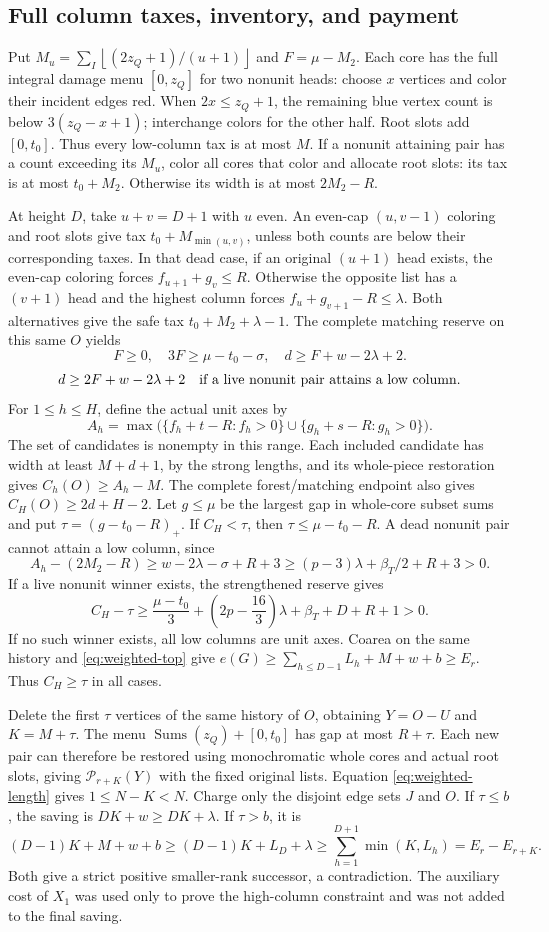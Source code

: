 \documentclass[11pt,a4paper]{article}
\newcommand{\p}{\mathcal P}
\newcommand{\floor}[1]{\left\lfloor#1\right\rfloor}
\theoremstyle{definition}
\begin{document}
\subsection{Full column taxes, inventory, and payment}
Put $M_u=\sum_I\floor{(2z_Q+1)/(u+1)}$ and $F=\mu-M_2$. Each core has the full integral damage menu $[0,z_Q]$ for two nonunit heads: choose $x$ vertices and color their incident edges red. When $2x\le z_Q+1$, the remaining blue vertex count is below $3(z_Q-x+1)$; interchange colors for the other half. Root slots add $[0,t_0]$. Thus every low-column tax is at most $M$. If a nonunit attaining pair has a count exceeding its $M_u$, color all cores that color and allocate root slots: its tax is at most $t_0+M_2$. Otherwise its width is at most $2M_2-R$.

At height $D$, take $u+v=D+1$ with $u$ even. An even-cap $(u,v-1)$ coloring and root slots give tax $t_0+M_{\min(u,v)}$, unless both counts are below their corresponding taxes. In that dead case, if an original $(u+1)$ head exists, the even-cap coloring forces $f_{u+1}+g_v\le R$. Otherwise the opposite list has a $(v+1)$ head and the highest column forces $f_u+g_{v+1}-R\le\lambda$. Both alternatives give the safe tax $t_0+M_2+\lambda-1$. The complete matching reserve on this same $O$ yields
\[
F\ge0,\quad 3F\ge\mu-t_0-\sigma,\quad
d\ge F+w-2\lambda+2.
\]
\[
d\ge2F+w-2\lambda+2
\quad\hbox{if a live nonunit pair attains a low column.}
\]
For $1\le h\le H$, define the actual unit axes by
\[
 A_h=\max\bigl(\{f_h+t-R:f_h>0\}\cup
                    \{g_h+s-R:g_h>0\}\bigr).
\]
The set of candidates is nonempty in this range. Each included candidate
has width at least $M+d+1$, by the strong lengths, and its whole-piece
restoration gives $C_h(O)\ge A_h-M$.
 The complete forest/matching endpoint also gives
$C_H(O)\ge2d+H-2$. Let $g\le\mu$ be the largest gap in whole-core subset sums and put $\tau=(g-t_0-R)_+$. If $C_H<\tau$, then $\tau\le\mu-t_0-R$. A dead nonunit pair cannot attain a low column, since
\[
A_h-(2M_2-R)\ge w-2\lambda-\sigma+R+3
\ge(p-3)\lambda+\beta_T/2+R+3>0.
\]
If a live nonunit winner exists, the strengthened reserve gives
\[
C_H-\tau\ge
\frac{\mu-t_0}{3}+\left(2p-\frac{16}{3}\right)\lambda+\beta_T+D+R+1>0.
\]
If no such winner exists, all low columns are unit axes. Coarea on the same history and \eqref{eq:weighted-top} give
$e(G)\ge\sum_{h\le D-1}L_h+M+w+b\ge E_r$. Thus $C_H\ge\tau$ in all cases.

Delete the first $\tau$ vertices of the same history of $O$, obtaining $Y=O-U$ and $K=M+\tau$. The menu
$\operatorname{Sums}(z_Q)+[0,t_0]$ has gap at most $R+\tau$. Each new pair can therefore be restored using monochromatic whole cores and actual root slots, giving $\p_{r+K}(Y)$ with the fixed original lists. Equation \eqref{eq:weighted-length} gives $1\le N-K<N$. Charge only the disjoint edge sets $J$ and $O$. If $\tau\le b$, the saving is $DK+w\ge DK+\lambda$. If $\tau>b$, it is
\[
(D-1)K+M+w+b\ge(D-1)K+L_D+\lambda
\ge\sum_{h=1}^{D+1}\min(K,L_h)=E_r-E_{r+K}.
\]
Both give a strict positive smaller-rank successor, a contradiction. The auxiliary cost of $X_1$ was used only to prove the high-column constraint and was not added to the final saving.
\end{document}
